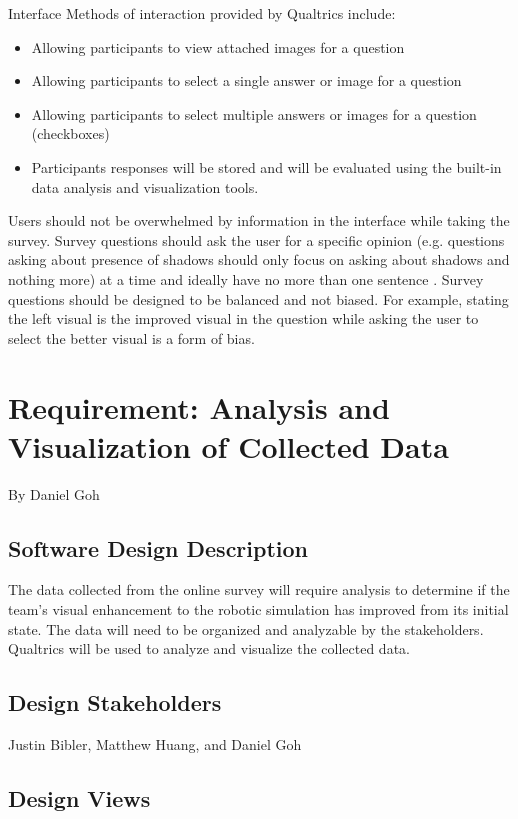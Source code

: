 \documentclass[10pt,journal,compsoc,draftclsnofoot]{IEEEtran}
\makeatletter
\newcommand\subparagraph{%
  \@startsection{subparagraph}{5}
  {\parindent}
  {3.25ex \@plus 1ex \@minus .2ex}
  {0.75ex plus 0.1ex}
  {\normalfont\normalsize\bfseries}}
\newcounter{subparagraph}[paragraph]
\makeatother
\begin{document}
\begin{flushleft}
\subparagraph{Interface}
Methods of interaction provided by Qualtrics include:
\begin{itemize}
\item Allowing participants to view attached images for a question
\item Allowing participants to select a single answer or image for a question
\item Allowing participants to select multiple answers or images for a question  (checkboxes)
\item Participants responses will be stored and will be evaluated using the built-in data analysis and visualization tools.
\end{itemize}

Users should not be overwhelmed by information in the interface while taking the survey.
Survey questions should ask the user for a specific opinion (e.g. questions asking about presence of shadows should only focus on asking about shadows and nothing more) at a time and ideally have no more than one sentence \cite{SMquestions}. 
Survey questions should be designed to be balanced and not biased.
For example, stating the left visual is the improved visual in the question while asking the user to select the better visual is a form of bias.  

\newpage

\section{Requirement: Analysis and Visualization of Collected Data}
\large{By Daniel Goh}

\normalsize
\subsection{Software Design Description}
The data collected from the online survey will require analysis to determine if the team's visual enhancement to the robotic simulation has improved from its initial state.
The data will need to be organized and analyzable by the stakeholders.
Qualtrics will be used to analyze and visualize the collected data.

\subsection{Design Stakeholders}
Justin Bibler, Matthew Huang, and Daniel Goh

\subsection{Design Views}

\end{flushleft}
\end{document}
